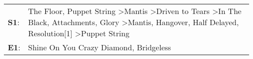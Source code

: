 \begin{supertabular}{p{0.03\textwidth}p{0.92\textwidth}}
 \textbf{S1}:  &  The Floor\textsuperscript{}, \enspace Puppet String\textsuperscript{} \textgreater \enspace Mantis\textsuperscript{} \textgreater \enspace Driven to Tears\textsuperscript{} \textgreater \enspace In The Black\textsuperscript{}, \enspace Attachments\textsuperscript{}, \enspace Glory\textsuperscript{} \textgreater \enspace Mantis\textsuperscript{}, \enspace Hangover\textsuperscript{}, \enspace Half Delayed\textsuperscript{}, \enspace Resolution[1]\textsuperscript{} \textgreater \enspace Puppet String\textsuperscript{}  \enspace  \\
 \textbf{E1}:  &                                                                                                                                                                                                                                                                                                                                                                                                                                                       Shine On You Crazy Diamond\textsuperscript{}, \enspace Bridgeless\textsuperscript{}  \enspace  \\
\end{supertabular}
